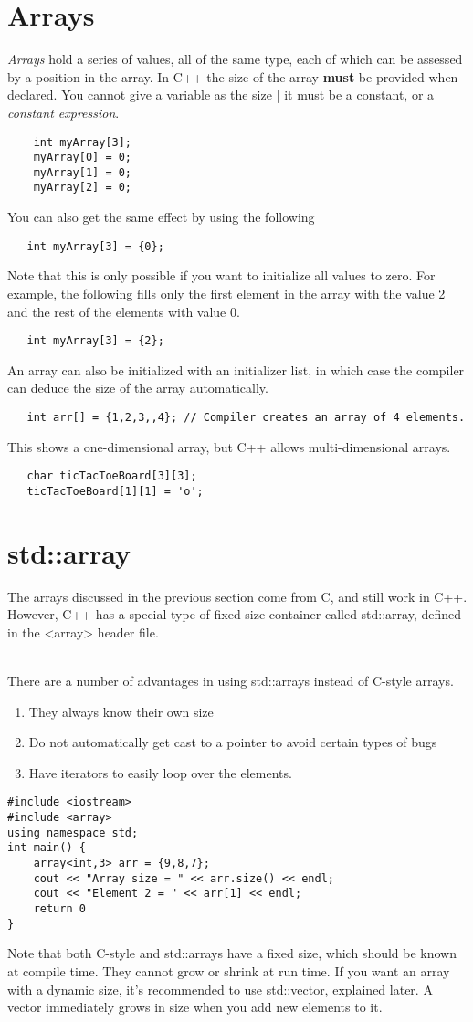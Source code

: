 \documentclass{article}
\begin{document}
\section{Arrays}
\textit{Arrays} hold a series of values, all of the same type, each of which can be assessed by a position
in the array. In C++ the size of the array \textbf{must} be provided when declared. You cannot give a
variable as the size | it must be a constant, or a \textit{constant expression}.
\begin{verbatim}
    int myArray[3];
    myArray[0] = 0;
    myArray[1] = 0;
    myArray[2] = 0;
\end{verbatim}
You can also get the same effect by using the following
\begin{verbatim}
   int myArray[3] = {0};
\end{verbatim}
Note that this is only possible if you want to initialize all values to zero. For example, the following
fills only the first element in the array with the value 2 and the rest of the elements with value 0.
\begin{verbatim}
   int myArray[3] = {2};
\end{verbatim}
An array can also be initialized with an initializer list, in which case the compiler can deduce the
size of the array automatically.
\begin{verbatim}
   int arr[] = {1,2,3,,4}; // Compiler creates an array of 4 elements.
\end{verbatim}
This shows a one-dimensional array, but C++ allows multi-dimensional arrays.
\begin{verbatim}
   char ticTacToeBoard[3][3];
   ticTacToeBoard[1][1] = 'o';
\end{verbatim}
\section{std::array}
The arrays discussed in the previous section come from C, and still work in C++. However, C++ has a
special type of fixed-size container called std::array, defined in the <array> header file.

\noindent \\ There are a number of advantages in using std::arrays instead of C-style arrays.
\begin{enumerate}
	\item They always know their own size
	\item Do not automatically get cast to a pointer to avoid certain types of bugs
	\item Have iterators to easily loop over the elements.
\end{enumerate}
\begin{verbatim}
#include <iostream>
#include <array>
using namespace std;
int main() {
    array<int,3> arr = {9,8,7};
    cout << "Array size = " << arr.size() << endl;
    cout << "Element 2 = " << arr[1] << endl;
    return 0
}
\end{verbatim}
Note that both C-style and std::arrays have a fixed size, which should be known at compile time.
They cannot grow or shrink at run time. If you want an array with a dynamic size, it's recommended
to use std::vector, explained later. A vector immediately grows in size when you add new elements to
it.
\end{document}
